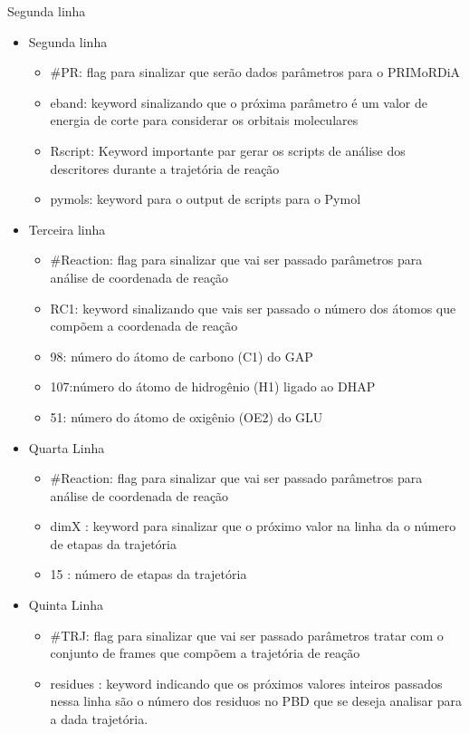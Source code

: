 \documentclass[a4paper,11pt]{refart}
\begin{document}
Segunda linha
\begin{itemize}
	\item Segunda linha
	\begin{itemize}
	\item \#PR:    flag para sinalizar que serão dados parâmetros para o PRIMoRDiA
	\item eband:   keyword sinalizando que o próxima parâmetro é um valor de energia de corte para considerar os orbitais moleculares
	\item Rscript: Keyword importante par gerar os scripts de análise dos descritores durante a trajetória de reação
	\item pymols:  keyword para o output de scripts para o Pymol
	\end{itemize}
	\item Terceira linha
	\begin{itemize}
	\item \#Reaction: flag para sinalizar que vai ser passado parâmetros para análise de coordenada de reação
	\item RC1: keyword sinalizando que vais ser passado o número dos átomos que compõem a coordenada de reação
	\item 98: número do átomo de carbono (C1) do GAP 
	\item 107:número do átomo de hidrogênio (H1) ligado ao DHAP
	\item 51: número do átomo de oxigênio (OE2) do GLU
	\end{itemize}
	\item Quarta Linha
	\begin{itemize}
	\item \#Reaction: flag para sinalizar que vai ser passado parâmetros para análise de coordenada de reação
	\item dimX      : keyword para sinalizar que o próximo valor na linha da o número de etapas da trajetória
	\item 15        : número de etapas da trajetória
	\end{itemize}
	\item Quinta Linha 
	\begin{itemize}
	\item \#TRJ: flag para sinalizar que vai ser passado parâmetros tratar com o conjunto de frames que compõem a trajetória de reação
	\item residues    : keyword indicando que os próximos valores inteiros passados nessa linha são o número dos residuos no PBD que se deseja analisar para a dada trajetória.

\end{itemize}
\end{itemize}
\end{document}
